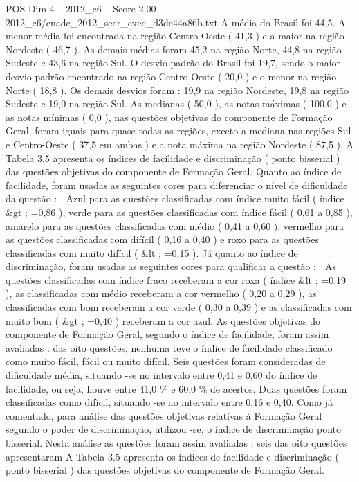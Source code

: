 \begin{textsample}{POS Dim 4 – 2012\_c6 – Score 2.00 – 2012\_c6/enade\_2012\_secr\_exec\_d3dc44a86b.txt}
A média do Brasil foi 44,5.
A menor média foi encontrada na região Centro-Oeste ( 41,3 ) e a maior na região Nordeste ( 46,7 ).
As demais médias foram 45,2 na região Norte, 44,8 na região Sudeste e 43,6 na região Sul.
O desvio padrão do Brasil foi 19,7, sendo o maior desvio padrão encontrado na região Centro-Oeste ( 20,0 ) e o menor na região Norte ( 18,8 ).
Os demais desvios foram : 19,9 na região Nordeste, 19,8 na região Sudeste e 19,0 na região Sul.
As medianas ( 50,0 ), as notas máximas ( 100,0 ) e as notas mínimas ( 0,0 ), nas questões objetivas do componente de Formação Geral, foram iguais para quase todas as regiões, exceto a mediana nas regiões Sul e Centro-Oeste ( 37,5 em ambas ) e a nota máxima na região Nordeste ( 87,5 ).
A Tabela 3.5 apresenta os índices de facilidade e discriminação ( ponto bisserial ) das questões objetivas do componente de Formação Geral.
Quanto ao índice de facilidade, foram usadas as seguintes cores para diferenciar o nível de dificuldade da questão :  Azul para as questões classificadas com índice muito fácil ( índice \&gt ; =0,86 ), verde para as questões classificadas com índice fácil ( 0,61 a 0,85 ), amarelo para as questões classificadas com médio ( 0,41 a 0,60 ), vermelho para as questões classificadas com difícil ( 0,16 a 0,40 ) e roxo para as questões classificadas com muito difícil ( \&lt ; =0,15 ).
Já quanto ao índice de discriminação, foram usadas as seguintes cores para qualificar a questão :  As questões classificadas com índice fraco receberam a cor roxa ( índice \&lt ; =0,19 ), as classificadas com médio receberam a cor vermelho ( 0,20 a 0,29 ), as classificadas com bom receberam a cor verde ( 0,30 a 0,39 ) e as classificadas com muito bom ( \&gt ; =0,40 ) receberam a cor azul.
As questões objetivas do componente de Formação Geral, segundo o índice de facilidade, foram assim avaliadas : das oito questões, nenhuma teve o índice de facilidade classificado como muito fácil, fácil ou muito difícil.
Seis questões foram consideradas de dificuldade média, situando -se no intervalo entre 0,41 e 0,60 do índice de facilidade, ou seja, houve entre 41,0 \% e 60,0 \% de acertos.
Duas questões foram classificadas como difícil, situando -se no intervalo entre 0,16 e 0,40.
Como já comentado, para análise das questões objetivas relativas à Formação Geral segundo o poder de discriminação, utilizou -se, o índice de discriminação ponto bisserial.
Nesta análise as questões foram assim avaliadas : seis das oito questões apresentaram A Tabela 3.5 apresenta os índices de facilidade e discriminação ( ponto bisserial ) das questões objetivas do componente de Formação Geral.

\end{textsample}
